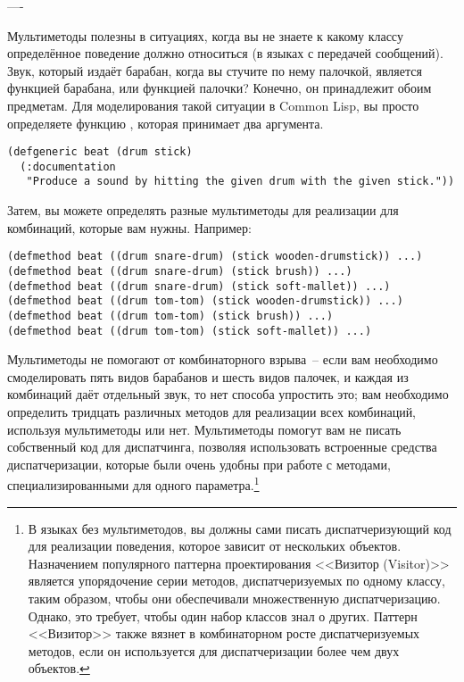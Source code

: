 ----

Мультиметоды полезны в ситуациях, когда вы не знаете к какому классу определённое
поведение должно относиться (в языках с передачей сообщений).  Звук, который издаёт
барабан, когда вы стучите по нему палочкой, является функцией барабана, или функцией
палочки?  Конечно, он принадлежит обоим предметам.  Для моделирования такой ситуации в
Common Lisp, вы просто определяете функцию , которая принимает два аргумента.

\begin{lstlisting}
(defgeneric beat (drum stick)
  (:documentation
   "Produce a sound by hitting the given drum with the given stick."))
\end{lstlisting}

Затем, вы можете определять разные мультиметоды для реализации  для комбинаций,
которые вам нужны. Например:

\begin{lstlisting}
(defmethod beat ((drum snare-drum) (stick wooden-drumstick)) ...)
(defmethod beat ((drum snare-drum) (stick brush)) ...)
(defmethod beat ((drum snare-drum) (stick soft-mallet)) ...)
(defmethod beat ((drum tom-tom) (stick wooden-drumstick)) ...)
(defmethod beat ((drum tom-tom) (stick brush)) ...)
(defmethod beat ((drum tom-tom) (stick soft-mallet)) ...)
\end{lstlisting}

Мультиметоды не помогают от комбинаторного взрыва~-- если вам необходимо смоделировать
пять видов барабанов и шесть видов палочек, и каждая из комбинаций даёт отдельный звук, то
нет способа упростить это; вам необходимо определить тридцать различных методов для
реализации всех комбинаций, используя мультиметоды или нет.  Мультиметоды помогут вам не
писать собственный код для диспатчинга, позволяя использовать встроенные средства
диспатчеризации, которые были очень удобны при работе с методами, специализированными для
одного параметра.\footnote{В языках без мультиметодов, вы должны сами писать
  диспатчеризующий код для реализации поведения, которое зависит от нескольких объектов.
  Назначением популярного паттерна проектирования <<Визитор (Visitor)>> является
  упорядочение серии методов, диспатчеризуемых по одному классу, таким образом, чтобы они
  обеспечивали множественную диспатчеризацию.  Однако, это требует, чтобы один набор
  классов знал о других.  Паттерн <<Визитор>> также вязнет в комбинаторном росте
  диспатчеризуемых методов, если он используется для диспатчеризации более чем двух
  объектов.}


